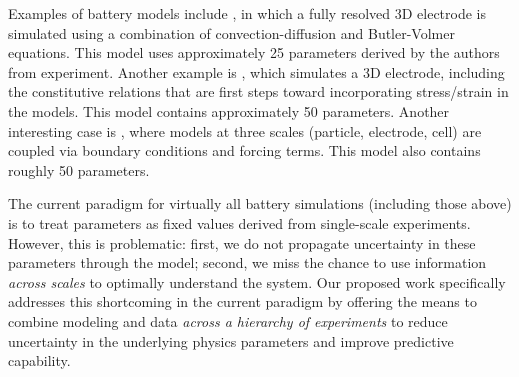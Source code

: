 \documentclass[11pt]{article}
\begin{document}
Examples of battery models include \cite{Less:2012}, in which a fully resolved 3D electrode is simulated using a combination
of convection-diffusion and Butler-Volmer equations. This model uses approximately 25 parameters derived by the authors from experiment.
Another example is \cite{Garcia2005}, which simulates a 3D electrode, including the constitutive relations that are first steps toward
incorporating stress/strain in the models. This model contains approximately 50 parameters.  Another interesting case is \cite{Kim-etal:2011}, where models at three scales (particle, electrode, cell) are coupled via boundary conditions and forcing terms. This model also contains roughly 50 parameters.

The current paradigm for virtually all battery simulations (including those above)
is to treat parameters as fixed values derived from single-scale experiments.
However, this is problematic: first, we do not propagate uncertainty in 
these parameters through the model; second, we miss the chance to use information \emph{across scales} to optimally understand
the system.  Our proposed work specifically addresses this shortcoming in the current paradigm by offering the means to 
combine modeling and data \emph{across a hierarchy of experiments}
to reduce uncertainty in the underlying physics parameters and improve predictive capability.
\end{document}
